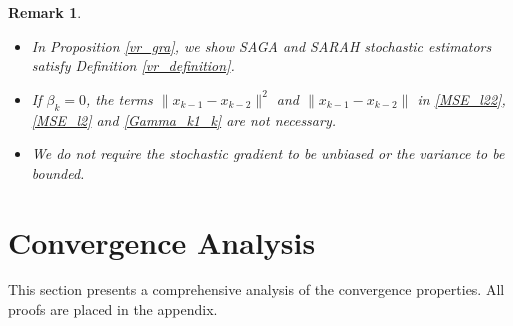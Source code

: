 \documentclass[letterpaper]{article} %
\newtheorem{remark}{Remark}
\begin{document}
	
	\begin{remark}
		\begin{itemize}
			\item In Proposition \ref{vr_gra}, we show   SAGA and SARAH stochastic estimators satisfy Definition \ref{vr_definition}. %
			\item If $\beta_{k}=0$,   the terms $\|x_{k-1}-x_{k-2}\|^{2}$ and $\|x_{k-1}-x_{k-2}\|$ in \eqref{MSE_l22}, \eqref{MSE_l2} and \eqref{Gamma_k1_k} are not necessary. 
			\item We do not require the stochastic gradient to be unbiased or the variance to be bounded. 
		\end{itemize}
	\end{remark}
	
	
	\section{Convergence Analysis}\label{convergence_analysis}
	This section presents a comprehensive analysis of the convergence properties. %
	All proofs are placed in the appendix. 
	
\end{document}
